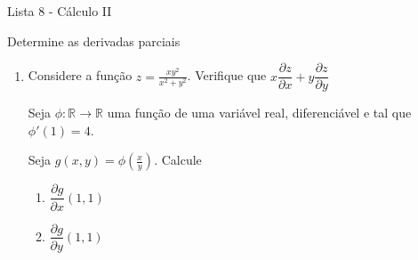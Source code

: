 \documentclass[11pt,a4paper]{article}
\begin{document}
	\begin{center}
		\Large Lista 8 - Cálculo II
	\end{center}
	
	Determine as derivadas parciais	
	
	\begin{enumerate}

	
	\begin{enumerate}
		\item $f(x,y) = 5x^4y^2 + xy^3 + 4$
		\item $\displaystyle\frac{x^3 + y^2}{x^2 + y^2}$
		\item $z = x^2 \ln (1 + x^2 + y^2)$
		\item $f(x,y) = (4xy - 3y^3)^3 + 5x^2y$
		\item $g(x,y) = x^y$
		\item $f(x,y) = \sqrt[3]{x^3 + y^2 + 3}$
		\item $\cos xy$
		\item $f(x,y) = e^{-x^2 - y^2}$
		
		
		
		
		
		
		
		
		
		
		
		
		
		
		\item $z = xye^{xy}$
		\item $z = \arctan x/y$
		\item $(x^2 + y^2) \ln(x^2 + y^2)$
		\item $z = \displaystyle\frac{x\sin y}{\cos (x^2 + y^2)}$
		
	\end{enumerate}
	
	\item Considere a função $z = \displaystyle\frac{xy^2}{x^2 + y^2}$. Verifique que $x\dfrac{\partial z}{\partial x} + y \dfrac{\partial z}{\partial y}$
	
	 Seja $\phi : \mathbb{R} \to \mathbb{R}$ uma função de uma variável real, diferenciável e tal que $\phi '(1) = 4$. 
	
	Seja $g(x,y) = \phi \left(\displaystyle\frac{x}{y}\right)$. Calcule
	
	\begin{enumerate}
		\item $\dfrac{\partial g}{\partial x}(1,1)$
		\item $\dfrac{\partial g}{\partial y}(1,1)$
	\end{enumerate}
	

\end{enumerate}
\end{document}
